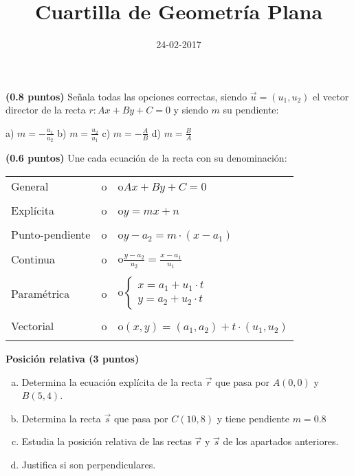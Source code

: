 \documentclass[palatino,noprobframes]{CuartillaSafa}
\title{Cuartilla de Geometría Plana}
\date{24-02-2017}
\renewcommand{\vec}[1]{\overrightarrow{#1}}
\begin{document}
\cabecera

\begin{problem}\textbf{(0.8 puntos)}
Señala todas las opciones correctas, siendo $\vec{u} = (u_1,u_2)$ el vector director de la recta $r: Ax+By+C = 0$ y siendo $m$ su pendiente:

a) $\displaystyle m=-\frac{u_1}{u_2}$\;\;\;\;\;\;\;\;\;
b) $\displaystyle m=\frac{u_2}{u_1}$\;\;\;\;\;\;\;\;\;
c) $\displaystyle m=-\frac{A}{B}$\;\;\;\;\;\;\;\;\;
d) $\displaystyle m=\frac{B}{A}$\;\;\;\;\;\;\;\;\;
\end{problem}


\begin{problem}\textbf{(0.6 puntos)} 
Une cada ecuación de la recta con su denominación:

\begin{tabular}{L{2.25cm}L{3cm}L{8cm}}
General 		&o& o\;\;$Ax+By+C=0$ \\\\
Explícita 		&o& o\;\;$y=mx+n$ \\\\
Punto-pendiente &o& o\;\;$y-a_2 = m·(x-a_1)$ \\\\
Continua 		&o& o\;\;$\displaystyle\frac{y-a_2}{u_2} = \frac{x-a_1}{u_1}$ \\\\
Paramétrica 	&o& o\;\;$\left\{\begin{array}{c} x=a_1+u_1·t\\y=a_2+u_2·t\end{array}\right.$ \\\\
Vectorial 		&o& o\;\;$(x,y) = (a_1,a_2) + t·(u_1,u_2)$ \\\\
\end{tabular}
\end{problem}
\vspace{-0.7cm}

\begin{problem}\textbf{ Posición relativa (3 puntos)}
\begin{enumerate}[a)]
	\vspace{-0.3cm}\item Determina la ecuación explícita de la recta $\vec{r}$ que pasa por $A(0,0)$ y $B(5,4)$.
	\vspace{-0.3cm}\item Determina la recta $\vec{s}$ que pasa por $C(10,8)$ y tiene pendiente $m=0.8$
	\vspace{-0.3cm}\item Estudia la posición relativa de las rectas $\vec{r}$ y $\vec{s}$ de los apartados anteriores.
	\vspace{-0.3cm}\item Justifica si son perpendiculares.
\end{enumerate}

\vspace{12cm}

\end{problem}
\end{document}
